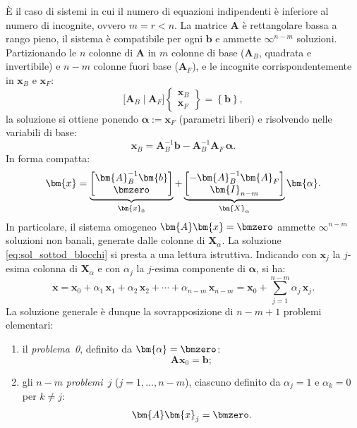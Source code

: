È il caso di sistemi in cui il numero di equazioni indipendenti	è inferiore al numero di incognite, ovvero $m=r<n$. La matrice
$\bm{A}$ è rettangolare bassa a rango pieno, il sistema è	compatibile per ogni $\bm{b}$ e ammette $\infty^{n-m}$ soluzioni.
Partizionando le $n$ colonne di $\bm{A}$ in $m$ colonne di base ($\bm{A}_B$, quadrata e invertibile) e $n-m$ colonne fuori base ($\bm{A}_F$), e le incognite corrispondentemente in $\bm{x}_B$ e $\bm{x}_F$:
\begin{equation}\label{eq:sist_sottod}
	\bigl[ \bm{A}_B \;\big|\; \bm{A}_F \bigr]
	\left\{ \begin{array}{c} \bm{x}_{B} \\ \hline \bm{x}_{F} \end{array} \right\}
	= \left\{ \bm{b}\right\},
\end{equation}
la soluzione si ottiene ponendo $\bm{\alpha} := \bm{x}_F$ (parametri liberi) e risolvendo nelle variabili di base:
\begin{equation}\label{eq:sol_sottod}
	\bm{x}_B = \bm{A}_B^{-1} \bm{b} - \bm{A}_B^{-1} \bm{A}_F \, \bm{\alpha}.
\end{equation}
In forma compatta:
\begin{equation}\label{eq:sol_sottod_blocchi}
	\bm{x} = \underbrace{\begin{bmatrix} \bm{A}_B^{-1}\bm{b} \\ \bmzero \end{bmatrix}}_{\bm{x}_0}
	+ \underbrace{\begin{bmatrix} -\bm{A}_B^{-1}\bm{A}_F \\ \bm{I}_{n-m} \end{bmatrix}}_{\bm{X}_\alpha} \bm{\alpha}.
\end{equation}
In particolare, il sistema omogeneo $\bm{A}\bm{x}=\bmzero$ ammette 	$\infty^{n-m}$ soluzioni non banali, generate dalle colonne di	$\bm{X}_\alpha$.
La soluzione \eqref{eq:sol_sottod_blocchi} si presta a una lettura
istruttiva. Indicando con $\bm{x}_j$ la $j$-esima colonna di
$\bm{X}_\alpha$ e con $\alpha_j$ la $j$-esima componente di
$\bm{\alpha}$, si ha:
\begin{equation}\label{eq:sovrapposizione_sottod}
	\bm{x} = \bm{x}_0
	+ \alpha_1\,\bm{x}_1
	+ \alpha_2\,\bm{x}_2
	+ \cdots
	+ \alpha_{n-m}\,\bm{x}_{n-m}
	= \bm{x}_0 + \sum_{j=1}^{n-m} \alpha_j\,\bm{x}_j.
\end{equation}
La soluzione generale \`e dunque la sovrapposizione di $n-m+1$
problemi elementari:
\begin{enumerate}[label=(\roman*)]
	\item il \textit{problema~0}, definito da $\bm{\alpha}=\bmzero$:
	\begin{equation}
		\bm{A}\bm{x}_0 = \bm{b};
	\end{equation}
	\item gli $n-m$ \textit{problemi~$j$} ($j=1,\ldots,n-m$),
	ciascuno definito da $\alpha_j=1$ e $\alpha_k=0$ per
	$k\neq j$:
	\begin{equation}
		\bm{A}\bm{x}_j = \bmzero.
	\end{equation}
\end{enumerate}
